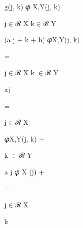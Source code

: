 \documentclass[a4paper,portrait,12pt]{article}
\begin{document}
\begin{flushleft}
g(j, k) 𝜑 X,Y(j, k)
\end{flushleft}


\begin{flushleft}
j$\in$ℛ X k$\in$ℛ Y
\end{flushleft}





\begin{flushleft}
(a j + k + b) 𝜑X,Y(j, k)
\end{flushleft}





=


\begin{flushleft}
j$\in$ℛ X k $\in$ℛ Y
\end{flushleft}





\begin{flushleft}
aj
\end{flushleft}





=


\begin{flushleft}
j$\in$ℛ X
\end{flushleft}





\begin{flushleft}
𝜑X,Y(j, k) +
\end{flushleft}


\begin{flushleft}
k $\in$ℛ Y
\end{flushleft}





\begin{flushleft}
a j 𝜑 X (j) +
\end{flushleft}





=


\begin{flushleft}
j$\in$ℛ X
\end{flushleft}





\begin{flushleft}
k
\end{flushleft}
\end{document}
